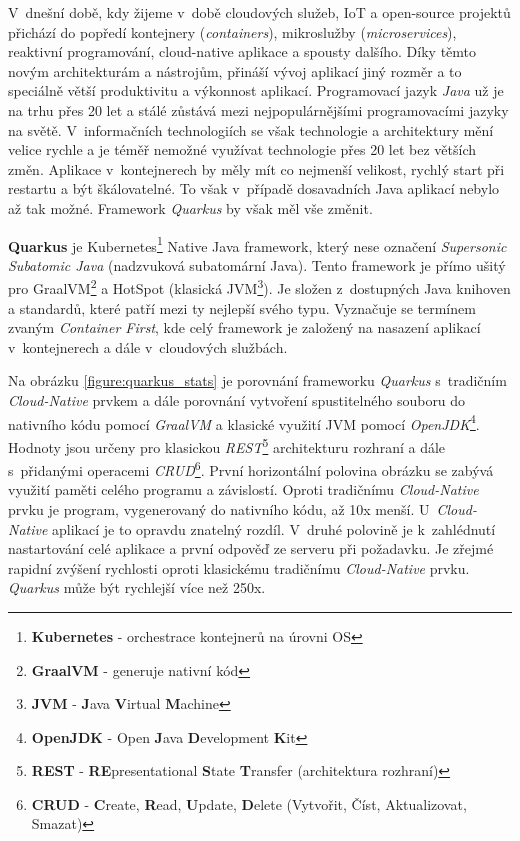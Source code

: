 V~dnešní době, kdy žijeme v~době cloudových služeb, IoT a open-source projektů přichází do popředí kontejnery (\emph{containers}), mikroslužby (\emph{microservices}), reaktivní programování, cloud-native aplikace a spousty dalšího.
Díky těmto novým architekturám a nástrojům, přináší vývoj aplikací jiný rozměr a to speciálně větší produktivitu a výkonnost aplikací.
Programovací jazyk \emph{Java} už je na trhu přes 20 let a stálé zůstává mezi nejpopulárnějšími programovacími jazyky na světě.
V~informačních technologiích se však technologie a architektury mění velice rychle a je téměř nemožné využívat technologie přes 20 let bez větších změn. Aplikace v~kontejnerech by měly mít co nejmenší velikost, rychlý start při restartu a být škálovatelné.
To však v~případě dosavadních Java aplikací nebylo až tak možné. Framework \emph{Quarkus} by však měl vše změnit.

\textbf{Quarkus} je Kubernetes\footnote{\textbf{Kubernetes} - orchestrace kontejnerů na úrovni OS} Native Java framework, který nese označení \emph{Supersonic Subatomic Java} (nadzvuková subatomární Java).
Tento framework je přímo ušitý pro GraalVM\footnote{\textbf{GraalVM} - generuje nativní kód} a HotSpot (klasická JVM\footnote{\textbf{JVM} - \textbf{J}ava \textbf{V}irtual \textbf{M}achine}).
Je složen z~dostupných Java knihoven a standardů, které patří mezi ty nejlepší svého typu.
Vyznačuje se termínem zvaným \emph{Container First}, kde celý framework je založený na nasazení aplikací v~kontejnerech a dále v~cloudových službách.~\cite{quarkus:infoDev}

Na obrázku \ref{figure:quarkus_stats} je porovnání frameworku \emph{Quarkus} s~tradičním \emph{Cloud-Native} prvkem a dále porovnání vytvoření spustitelného souboru do nativního kódu pomocí \emph{GraalVM} a klasické využití JVM pomocí \emph{OpenJDK}\footnote{\textbf{OpenJDK} - Open \textbf{J}ava \textbf{D}evelopment \textbf{K}it}.
Hodnoty jsou určeny pro klasickou \emph{REST}\footnote{\textbf{REST} - \textbf{RE}presentational \textbf{S}tate \textbf{T}ransfer (architektura rozhraní)} architekturu rozhraní a dále s~přidanými operacemi \emph{CRUD}\footnote{\textbf{CRUD} - \textbf{C}reate, \textbf{R}ead, \textbf{U}pdate, \textbf{D}elete (Vytvořit, Číst, Aktualizovat, Smazat)}.
První horizontální polovina obrázku se zabývá využití paměti celého programu a závislostí.
Oproti tradičnímu \emph{Cloud-Native} prvku je program, vygenerovaný do nativního kódu, až 10x menší.
U~\emph{Cloud-Native} aplikací je to opravdu znatelný rozdíl.
V~druhé polovině je k~zahlédnutí nastartování celé aplikace a první odpověď ze serveru při požadavku.
Je zřejmé rapidní zvýšení rychlosti oproti klasickému tradičnímu \emph{Cloud-Native} prvku.
\emph{Quarkus} může být rychlejší více než 250x.~\cite{quarkus:website}


